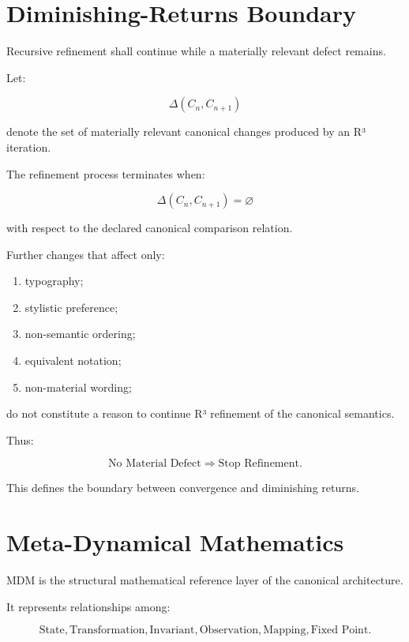\documentclass[11pt]{article}
\newcommand{\MDM}{\ensuremath{\mathrm{MDM}}}
\begin{document}
\section{Diminishing-Returns Boundary}

Recursive refinement shall continue while a materially relevant
defect remains.

Let:

\[
\Delta(C_n,C_{n+1})
\]

denote the set of materially relevant canonical changes produced
by an R³ iteration.

The refinement process terminates when:

\[
\boxed{
\Delta(C_n,C_{n+1})=\varnothing
}
\]

with respect to the declared canonical comparison relation.

Further changes that affect only:

\begin{enumerate}
    \item typography;
    \item stylistic preference;
    \item non-semantic ordering;
    \item equivalent notation;
    \item non-material wording;
\end{enumerate}

do not constitute a reason to continue R³ refinement of the
canonical semantics.

Thus:

\[
\boxed{
\text{No Material Defect}
\Rightarrow
\text{Stop Refinement}.
}
\]

This defines the boundary between convergence and diminishing
returns.

\section{Meta-Dynamical Mathematics}

\MDM{} is the structural mathematical reference layer of the
canonical architecture.

It represents relationships among:

\[
\boxed{
\text{State},
\text{Transformation},
\text{Invariant},
\text{Observation},
\text{Mapping},
\text{Fixed Point}.
}
\]
\end{document}
